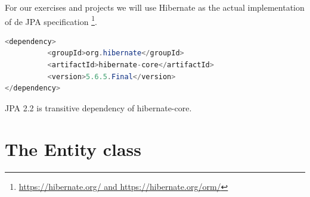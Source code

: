 

For our exercises and projects we will use Hibernate as the actual implementation of de JPA specification \footnote{\url{https://hibernate.org/ and https://hibernate.org/orm/}}.  

\begin{lstlisting}[frame=single, language=java]
<dependency>
		  <groupId>org.hibernate</groupId>
		  <artifactId>hibernate-core</artifactId>
		  <version>5.6.5.Final</version>
</dependency>
\end{lstlisting}

JPA 2.2 is transitive dependency of hibernate-core.

\section{The Entity class}

